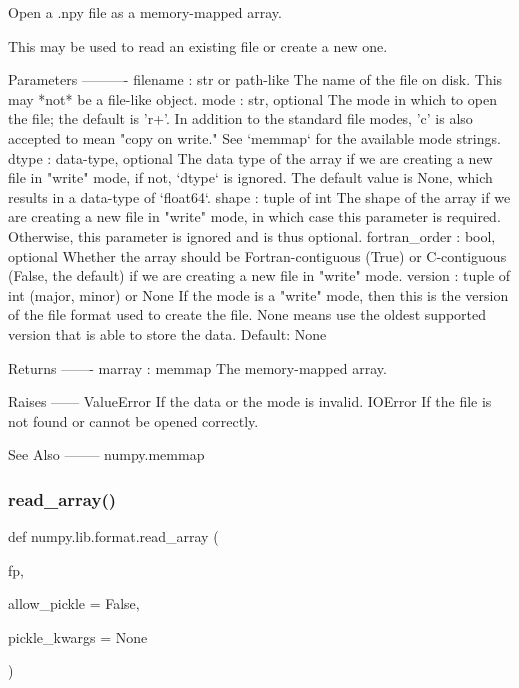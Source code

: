 \begin{DoxyVerb}Open a .npy file as a memory-mapped array.

This may be used to read an existing file or create a new one.

Parameters
----------
filename : str or path-like
    The name of the file on disk.  This may *not* be a file-like
    object.
mode : str, optional
    The mode in which to open the file; the default is 'r+'.  In
    addition to the standard file modes, 'c' is also accepted to mean
    "copy on write."  See `memmap` for the available mode strings.
dtype : data-type, optional
    The data type of the array if we are creating a new file in "write"
    mode, if not, `dtype` is ignored.  The default value is None, which
    results in a data-type of `float64`.
shape : tuple of int
    The shape of the array if we are creating a new file in "write"
    mode, in which case this parameter is required.  Otherwise, this
    parameter is ignored and is thus optional.
fortran_order : bool, optional
    Whether the array should be Fortran-contiguous (True) or
    C-contiguous (False, the default) if we are creating a new file in
    "write" mode.
version : tuple of int (major, minor) or None
    If the mode is a "write" mode, then this is the version of the file
    format used to create the file.  None means use the oldest
    supported version that is able to store the data.  Default: None

Returns
-------
marray : memmap
    The memory-mapped array.

Raises
------
ValueError
    If the data or the mode is invalid.
IOError
    If the file is not found or cannot be opened correctly.

See Also
--------
numpy.memmap\end{DoxyVerb}
 \mbox{\label{namespacenumpy_1_1lib_1_1format_ad0c61d5ab87819a60263307a3e9623d7}} 
\subsubsection{\texorpdfstring{read\+\_\+array()}{read\_array()}}
{\footnotesize\ttfamily def numpy.\+lib.\+format.\+read\+\_\+array (\begin{DoxyParamCaption}\item[{}]{fp,  }\item[{}]{allow\+\_\+pickle = {\ttfamily False},  }\item[{}]{pickle\+\_\+kwargs = {\ttfamily None} }\end{DoxyParamCaption})}

